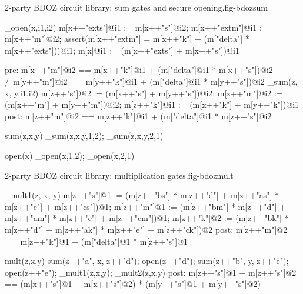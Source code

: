 \begin{fpfig}[t]{2-party BDOZ circuit library: sum gates and secure opening.}{fig-bdozsum}
{\footnotesize
\begin{verbatimtab}
  _open(x,i1,i2){
    m[x++"exts"]@i1 := m[x++"s"]@i2;
    m[x++"extm"]@i1 := m[x++"m"]@i2;
    assert(m[x++"extm"] = m[x++"k"] + (m["delta"] * m[x++"exts"]))@i1;
    m[x]@i1 := (m[x++"exts"] + m[x++"s"])@i1
  }
  
  pre: { m[x++"m"]@i2 == m[x++"k"]@i1 + (m["delta"]@i1 * m[x++"s"])@i2 /\
         m[y++"m"]@i2 == m[y++"k"]@i1 + (m["delta"]@i1 * m[y++"s"])@i2 }
  _sum(z, x, y,i1,i2) {
      m[z++"s"]@i2 := (m[x++"s"] + m[y++"s"])@i2;
      m[z++"m"]@i2 := (m[x++"m"] + m[y++"m"])@i2;
      m[z++"k"]@i1 := (m[x++"k"] + m[y++"k"])@i1
  }
  post: { m[z++"m"]@i2 == m[z++"k"]@i1 + (m["delta"]@i1 * m[z++"s"]@i2 } 
  
  sum(z,x,y) { _sum(z,x,y,1,2); _sum(z,x,y,2,1) }

  open(x) { _open(x,1,2); _open(x,2,1) }
\end{verbatimtab}
}
\end{fpfig}

\begin{fpfig}[t]{2-party BDOZ circuit library: multiplication gates.}{fig-bdozmult}
{\footnotesize
\begin{verbatimtab}
  _mult1(z, x, y) {
      m[z++"s"]@1 :=
        (m[z++"bs"] * m[z++"d"] + m[z++"as"] * m[z++"e"] + m[z++"cs"])@1;
      m[z++"m"]@1 :=
        (m[z++"bm"] * m[z++"d"] + m[z++"am"] * m[z++"e"] + m[z++"cm"])@1;
      m[z++"k"]@2 :=
        (m[z++"bk"] * m[z++"d"] + m[z++"ak"] * m[z++"e"] + m[z++"ck"])@2    
  }
  post: { m[z++"m"]@2 == m[z++"k"]@1 + (m["delta"]@1 * m[z++"s"]@1 }

  mult(z,x,y) {
      sum(z++"a", x, z++"d");
      open(z++"d");
      sum(z++"b", y, z++"e");
      open(z++"e"); 
      _mult1(z,x,y); _mult2(z,x,y)
  }
  post: {  m[z++"s"]@1 + m[z++"s"]@2 ==
          (m[x++"s"]@1 + m[x++"s"]@2) * (m[y++"s"]@1 + m[y++"s"]@2)} 
  
\end{verbatimtab}
}
\end{fpfig}

\begin{comment}
      m[z++"ds"]@1 as m[x++"s"]@2 + r[z++"as"]@2;
      m[z++"ds"]@2 as m[x++"s"]@1 + r[z++"as"]@1;
      m[z++"ms"]@2 as m[z++"k"]@1 + (m["delta"]@1 * m[z++"ds"]@2);
      m[z++"ms"]@1 as m[z++"k"]@2 + (m["delta"]@2 * m[z++"ds"]@1);
\end{comment}
